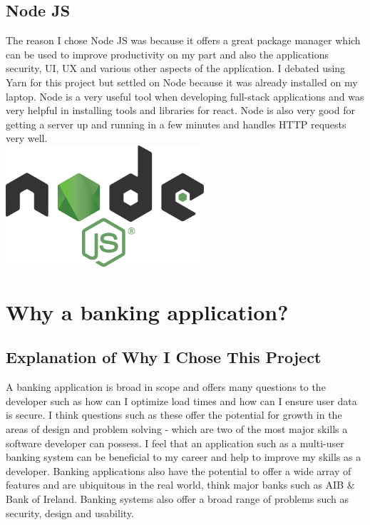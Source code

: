 \subsection{Node JS}
The reason I chose Node JS was because it offers a great package manager which can be
used to improve productivity on my part and also the applications security, UI,
UX and various other aspects of the application.  I debated using Yarn for this
project but settled on Node because it was already installed on my laptop.  Node
is a very useful tool when developing full-stack applications and was very helpful
in installing tools and libraries for react.  Node is also very good for getting a server
up and running in a few minutes and handles HTTP requests very well.
\\
\includegraphics[width=\textwidth,height=4.5cm]{img/node.png} \cite{NodeImage}
\\
\section{Why a banking application?}
\subsection{Explanation of Why I Chose This Project}
A banking application is broad in scope and offers many questions to the developer
such as how can I optimize load times and how can I ensure user data is secure.
I think questions such as these offer the potential for growth in the areas of
design and problem solving - which are two of the most major skills a software
developer can possess. I feel that an application such as a multi-user banking
system can be beneficial to my career and help to improve my skills as a developer.
Banking applications also have the potential to offer a wide array of features and
are ubiquitous in the real world, think major banks such as AIB \& Bank of Ireland.
Banking systems also offer a broad range of problems such as security, design
and usability.
\\
